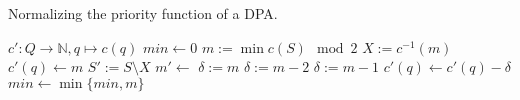 \begin{algorithm}[h!] %
  \caption{Normalizing the priority function of a DPA.}
  \label{alg:general:normalize_c}
  \begin{algorithmic}[1]
      \State $c' : Q \rightarrow \mathbb{N}, q \mapsto c(q)$
      \State {}
      \State {}
    \EndFunction
    \Statex
        \State {}
      \EndIf
      \State $min \gets 0$
        \State $m := \min c(S) \mod 2$
        \State $X := c^{-1}(m)$
          \State $c'(q) \gets m$
        \EndFor
        \State $S' := S \setminus X$
        \State $m' \gets $
            \State $\delta := m$
          \Else
            \State $\delta := m-2$
          \EndIf
        \Else
          \State $\delta := m-1$
        \EndIf
          \State $c'(q) \gets c'(q) - \delta$
        \EndFor
        \State $min \gets \min \{min, m\}$
      \EndFor
      \State {}
    \EndFunction
  \end{algorithmic}
\end{algorithm}










